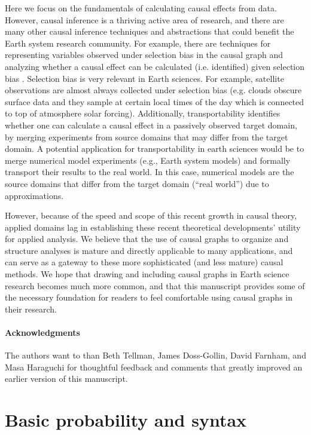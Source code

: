 \documentclass[12pt]{article}
\begin{document}
Here we focus on the fundamentals of calculating causal effects from
data. However, causal inference is a thriving active area of research,
and there are many other causal inference techniques and abstractions
that could benefit the Earth system research community. For example,
there are techniques for representing variables observed under
selection bias in the causal graph and analyzing whether a causal
effect can be calculated (i.e. identified) given selection bias
\citep[e.g.,][]{bareinboim2014recovering}. Selection bias is very
relevant in Earth sciences. For example, satellite observations are
almost always collected under selection bias (e.g. clouds obscure
surface data and they sample at certain local times of the day which
is connected to top of atmosphere solar forcing). Additionally,
transportability \citep[e.g.,][]{bareinboim2012transportability}
identifies whether one can calculate a causal effect in a passively
observed target domain, by merging experiments from source domains
that may differ from the target domain. A potential application for
transportability in earth sciences would be to merge numerical model
experiments (e.g., Earth system models) and
formally transport their results to the real world. In this case,
numerical models are the source domains that differ from the target
domain (``real world'') due to approximations.

However, because of the speed and scope of this recent growth in
causal theory, applied domains lag in establishing these recent
theoretical developments' utility for applied analysis. We believe
that the use of causal graphs to organize and structure analyses is
mature and directly applicable to many applications, and can serve as
a gateway to these more sophisticated (and less mature) causal
methods. We hope that drawing and including causal graphs in Earth
science research becomes much more common, and that this manuscript
provides some of the necessary foundation for readers to feel
comfortable using causal graphs in their research.

\paragraph{Acknowledgments} The authors want to than Beth Tellman,
James Doss-Gollin, David Farnham, and Masa Haraguchi for thoughtful
feedback and comments that greatly improved an earlier version of this
manuscript.




\appendix
\section{Basic probability and syntax}
\label{prob-theory}
\end{document}
